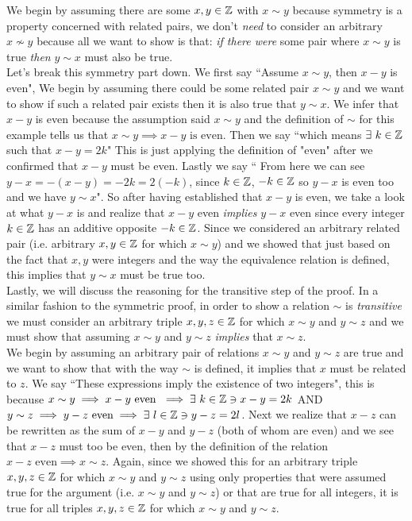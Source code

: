 We begin by assuming there are some $x,y\in {\mathbb{ Z}}$ with $x\sim y$ because symmetry is a property concerned with related pairs, we don't \textit{need} to consider an arbitrary $x\not\sim y$ because all we want to show is that: \textit{if there were} some pair where $x\sim y$ is true \textit{then} $y\sim x$ must also be true. \steezybreak\\
Let's break this symmetry part down. We first say ``Assume $x\sim y$, then $x-y$ is even", We begin by assuming there could be some related pair $x\sim y$ and we want to show if such a related pair exists then it is also true that $y\sim x$. We infer that $x-y$ is even because the assumption said $x\sim y$ and the definition of $\sim$ for this example tells us that $x\sim y \implies x-y \text{ is even}$. Then we say ``which means $\exists \ k\in {\mathbb{ Z}}$ such that $x-y=2k$" This is just applying the definition of "even" after we confirmed that $x-y$ must be even. Lastly we say `` From here we can see $y-x=-(x-y)=-2k=2(-k)$, since $k\in {\mathbb{ Z}}$, $-k\in {\mathbb{ Z}}$ so $y-x$ is even too and we have $y\sim x$". So after having established that $x-y$ is even, we take a look at what $y-x$ is and realize that $x-y$ even \textit{implies} $y-x$ even since every integer $k\in {\mathbb{ Z}}$ has an additive opposite $-k\in {\mathbb{ Z}}$. Since we considered an arbitrary related pair (i.e. arbitrary $x,y\in {\mathbb{ Z}}$ for which $x\sim y$) and we showed that just based on the fact that $x,y$ were integers and the way the equivalence relation is defined, this implies that $y\sim x$ must be true too.\steezybreak\\
Lastly, we will discuss the reasoning for the transitive step of the proof. In a similar fashion to the symmetric proof, in order to show a relation $\sim$ is \textit{transitive} we must consider an arbitrary triple $x,y,z \in {\mathbb{ Z}}$ for which $x\sim y$ and $y\sim z$ and we must show that assuming $x\sim y$ and $y\sim z$ \textit{implies} that $x\sim z$.\steezybreak\\
We begin by assuming an arbitrary pair of relations $x\sim y$ and $y\sim z$ are true and we want to show that with the way $\sim$ is defined, it implies that $x$ must be related to $z$. We say ``These expressions imply the existence of two integers", this is because $x\sim y\implies x-y \text{ even }\implies \exists \ k\in {\mathbb{ Z}} \ni x-y=2k$ AND $y\sim z\implies y-z \text{ even}\implies \exists \ l\in \Z \ni y-z=2l$. Next we realize that $x-z$ can be rewritten as the sum of $x-y$ and $y-z$ (both of whom are even) and we see that $x-z$ must too be even, then by the definition of the relation $x-z \text{ even}\implies x\sim z$. Again, since we showed this for an arbitrary triple $x,y,z\in {\mathbb{ Z}}$ for which $x\sim y$ and $y\sim z$ using only properties that were assumed true for the argument (i.e. $x\sim y$ and $y\sim z$) or that are true for all integers, it is true for all triples $x,y,z\in {\mathbb{ Z}}$ for which $x\sim y$ and $y\sim z$.


